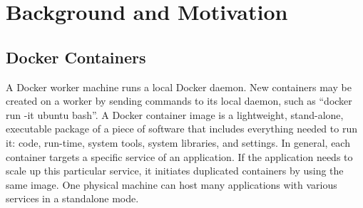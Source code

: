 \section{Background and Motivation}
\label{back}
\subsection{Docker Containers}

A Docker worker machine runs a local Docker daemon. 
New containers may be created on a worker by sending commands to its local daemon, such as ``docker
run -it ubuntu bash''.
A Docker container image is a lightweight, stand-alone, executable package of a piece of software that 
includes everything needed to run it: code, run-time, system tools, system libraries, and settings.
In general, each container targets a specific service of an application. If the application needs to scale up this particular service, 
it initiates duplicated containers by using the same image. One physical machine can host many applications with various services in a standalone mode.

\begin{comment}
\begin{figure}[ht]
\centering
\texttt{[image: docker-standalone]}
\caption{Docker Containers}
\label{fig:docker-standalone} 
\end{figure}
\end{comment}

